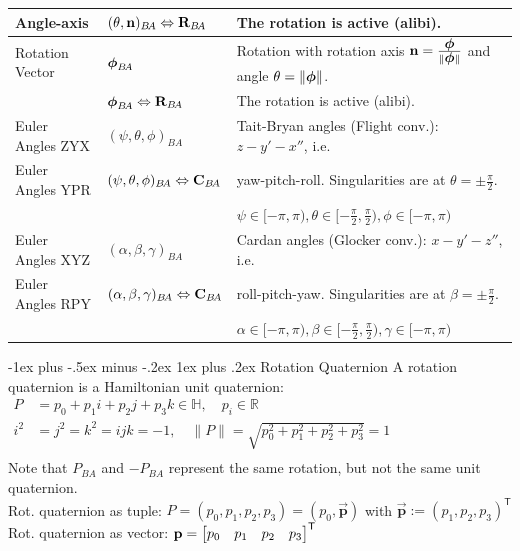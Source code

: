 \documentclass[10pt,landscape,a4paper]{article}
\makeatletter
\renewcommand{\subsubsection}{\@startsection{subsubsection}{3}{0mm}%
                                {-1ex plus -.5ex minus -.2ex}%
                                {1ex plus .2ex}%
                                {\normalfont\small\bfseries}}
\newcommand\norm[1]{\lVert #1 \rVert}
\newcommand\transpose{\mathsf{T}}
\newcommand\imquatvec[1]{\overrightarrow{\mathbf{#1}}}
\newcommand\rotmat[2]{\vR_{#1\!#2}}
\newcommand\comat[2]{\vC_{#1\!#2}}
\newcommand\Quat[2]{P_{#1\!#2}}
\newcommand\angleaxis[2]{(\theta,\vn)_{#1\!#2}}
\newcommand\rotvec[2]{\vvph_{#1\!#2}}
\makeatother
\begin{document}
\begin{multicols}{2}
\begin{tabular}{|l|l@{}|l@{}|}
Angle-axis & $\angleaxis{B}{A} \Leftrightarrow \rotmat{B}{A}$  & The rotation is active (alibi). \\ \hline
Rotation Vector & $ \rotvec{B}{A} $  &  Rotation with rotation axis $\vn = \frac{\vvph}{\norm{\vvph}}$ and angle $\theta = \norm{\vvph}$. \\ 
 & $\rotvec{B}{A} \Leftrightarrow \rotmat{B}{A} $ &  The rotation is active (alibi). \\ \hline
Euler Angles ZYX &  $(\psi, \theta, \phi)_{B\!A}$  & Tait-Bryan angles (Flight conv.): $z-y'-x''$, i.e.\   \\
Euler Angles YPR & $(\psi, \theta, \phi)_{B\!A} \Leftrightarrow \comat{B}{A} $ & yaw-pitch-roll. Singularities are at $\theta=\pm\frac{\pi}{2}$. \\
 &  & $\psi\in[-\pi,\pi), \theta\in[-\frac{\pi}{2},\frac{\pi}{2}), \phi\in[-\pi,\pi)$  \\  \hline
Euler Angles XYZ &  $(\alpha, \beta, \gamma)_{B\!A}$ & Cardan angles (Glocker conv.): $x-y'-z''$, i.e.\ \\
Euler Angles RPY & $(\alpha, \beta, \gamma)_{B\!A} \Leftrightarrow \comat{B}{A}$ & roll-pitch-yaw. Singularities are at $\beta=\pm\frac{\pi}{2}$.  \\
 &  & $\alpha\in[-\pi,\pi), \beta\in[-\frac{\pi}{2},\frac{\pi}{2}), \gamma\in[-\pi,\pi)$  \\  \hline
\end{tabular} %

\subsubsection{Rotation Quaternion}
A rotation quaternion is a Hamiltonian unit quaternion: \\
$\boxed{\begin{aligned}P &= p_0 + p_1 i + p_2 j + p_3 k \in \mathbb{H}, \quad p_i \in \mathbb{R} \\
i^2 &= j^2=k^2 = ijk = -1, \quad \norm{P}= \sqrt{p_0^2 + p_1^2 + p_2^2 + p_3^2} = 1 \\
\end{aligned}}$   \\
Note that $\Quat{B}{A}$ and $-\Quat{B}{A}$ represent the same rotation, but not the same unit quaternion. \\
Rot. quaternion as tuple: $P = (p_0, p_1, p_2, p_3) = (p_0, \imquatvec{p})$ with $\imquatvec{p} := (p_1, p_2, p_3)^\transpose $ \\
Rot. quaternion as vector: $\vp = \begin{bmatrix} p_0 & p_1 & p_2 & p_3 \end{bmatrix}^\transpose $\\


\end{multicols}
\end{document}
